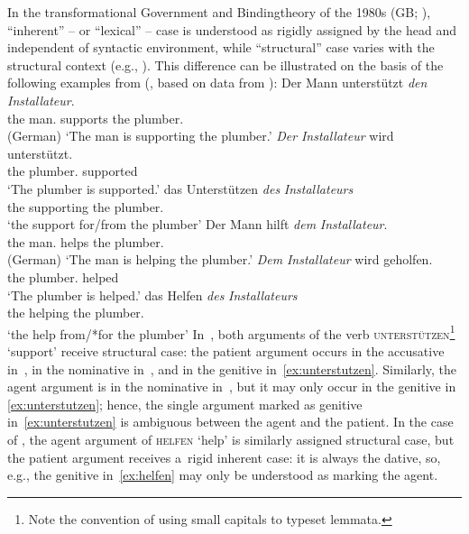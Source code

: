 \documentclass[output=paper,biblatex,babelshorthands,newtxmath,draftmode,colorlinks,citecolor=brown]{langscibook}
\begin{document}
In the transformational Government and Binding\indexgb theory of the 1980s (GB; \citealt{chom:81,chom:86a}), “inherent” -- or “lexical” -- case is understood as rigidly assigned by the head and independent of syntactic environment, while “structural” case varies with the structural context (e.g., \citealt[70]{Haider85b}).  This difference can be illustrated on the basis of the following examples from  (\citealt[63]{Prze99b}, based on data from \citealt{HM94a}):
\eal
\label{ex:unterstutzen}
\ex
\gll Der Mann unterstützt \emph{den} \emph{Installateur}. \\ 
      the man.\NOM{} supports the plumber.\ACC{}\\\hfill(German)
\glt    `The man is supporting the plumber.'
\ex
\gll \emph{Der} \emph{Installateur} wird unterstützt. \\
      the plumber.\NOM{} \Aux{} supported\\
\glt  `The plumber is supported.'
\ex
\gll  das Unterstützen \emph{des} \emph{Installateurs} \\
      the supporting the plumber.\GEN{}\\
\glt  `the support for/from the plumber'
\zl
\eal
\label{ex:helfen}
\ex
\gll  Der Mann hilft \emph{dem} \emph{Installateur}. \\
      the man.\NOM{} helps the plumber.\DAT{}\\\hfill(German)
\glt `The man is helping the plumber.'
\ex
\gll  \emph{Dem} \emph{Installateur} wird geholfen. \\
      the plumber.\DAT{} \Aux{} helped\\
\glt  `The plumber is helped.'
\ex
\gll  das Helfen \emph{des} \emph{Installateurs} \\
      the helping the plumber.\GEN{}\\
\glt    `the help from/*for the plumber'
\zl
In~, both arguments of the verb \textsc{unterstützen}\footnote{Note the convention of using small capitals to typeset lemmata.} `support’ receive structural case: the patient argument occurs in the accusative in~, in the nominative in~, and in the genitive in~\cref{ex:unterstutzen}.  Similarly, the agent argument is in the nominative in~, but it may only occur in the genitive in \cref{ex:unterstutzen}; hence, the single argument marked as genitive in~\cref{ex:unterstutzen} is ambiguous between the agent and the patient.  In the case of , the agent argument of \textsc{helfen} `help’ is similarly assigned structural case, but the patient argument receives a~rigid inherent case: it is always the dative, so, e.g., the genitive in~\cref{ex:helfen} may only be understood as marking the agent.
\end{document}
